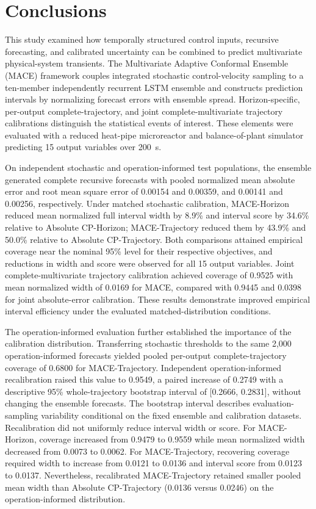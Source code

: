 
\section{Conclusions}
\label{sec:conclusions}

This study examined how temporally structured control inputs, recursive forecasting, and calibrated uncertainty can be combined to predict multivariate physical-system transients. The Multivariate Adaptive Conformal Ensemble (MACE) framework couples integrated stochastic control-velocity sampling to a ten-member independently recurrent LSTM ensemble and constructs prediction intervals by normalizing forecast errors with ensemble spread. Horizon-specific, per-output complete-trajectory, and joint complete-multivariate trajectory calibrations distinguish the statistical events of interest. These elements were evaluated with a reduced heat-pipe microreactor and balance-of-plant simulator predicting 15 output variables over 200~s.

On independent stochastic and operation-informed test populations, the ensemble generated complete recursive forecasts with pooled normalized mean absolute error and root mean square error of 0.00154 and 0.00359, and 0.00141 and 0.00256, respectively. Under matched stochastic calibration, MACE-Horizon reduced mean normalized full interval width by 8.9\% and interval score by 34.6\% relative to Absolute CP-Horizon; MACE-Trajectory reduced them by 43.9\% and 50.0\% relative to Absolute CP-Trajectory. Both comparisons attained empirical coverage near the nominal 95\% level for their respective objectives, and reductions in width and score were observed for all 15 output variables. Joint complete-multivariate trajectory calibration achieved coverage of 0.9525 with mean normalized width of 0.0169 for MACE, compared with 0.9445 and 0.0398 for joint absolute-error calibration. These results demonstrate improved empirical interval efficiency under the evaluated matched-distribution conditions.

The operation-informed evaluation further established the importance of the calibration distribution. Transferring stochastic thresholds to the same 2{,}000 operation-informed forecasts yielded pooled per-output complete-trajectory coverage of 0.6800 for MACE-Trajectory. Independent operation-informed recalibration raised this value to 0.9549, a paired increase of 0.2749 with a descriptive 95\% whole-trajectory bootstrap interval of [0.2666, 0.2831], without changing the ensemble forecasts. The bootstrap interval describes evaluation-sampling variability conditional on the fixed ensemble and calibration datasets. Recalibration did not uniformly reduce interval width or score. For MACE-Horizon, coverage increased from 0.9479 to 0.9559 while mean normalized width decreased from 0.0073 to 0.0062. For MACE-Trajectory, recovering coverage required width to increase from 0.0121 to 0.0136 and interval score from 0.0123 to 0.0137. Nevertheless, recalibrated MACE-Trajectory retained smaller pooled mean width than Absolute CP-Trajectory (0.0136 versus 0.0246) on the operation-informed distribution.

